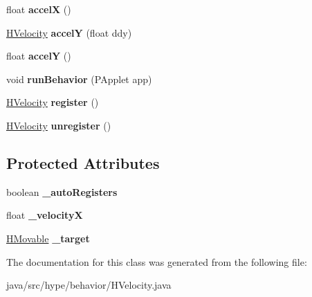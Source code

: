 \begin{DoxyCompactItemize}
\item 
\hypertarget{classhype_1_1behavior_1_1_h_velocity_ab44947a8dd5df4a12ee2cd3295beea59}{float {\bfseries accel\-X} ()}\label{classhype_1_1behavior_1_1_h_velocity_ab44947a8dd5df4a12ee2cd3295beea59}

\item 
\hypertarget{classhype_1_1behavior_1_1_h_velocity_ad1dc3d8cf2f5ce87c2a5c5dd5048e399}{\hyperlink{classhype_1_1behavior_1_1_h_velocity}{H\-Velocity} {\bfseries accel\-Y} (float ddy)}\label{classhype_1_1behavior_1_1_h_velocity_ad1dc3d8cf2f5ce87c2a5c5dd5048e399}

\item 
\hypertarget{classhype_1_1behavior_1_1_h_velocity_a71da143ee1531bb9a57a9d155eaa7028}{float {\bfseries accel\-Y} ()}\label{classhype_1_1behavior_1_1_h_velocity_a71da143ee1531bb9a57a9d155eaa7028}

\item 
\hypertarget{classhype_1_1behavior_1_1_h_velocity_acc6d4560989de30788ec2ae4f1ea6913}{void {\bfseries run\-Behavior} (P\-Applet app)}\label{classhype_1_1behavior_1_1_h_velocity_acc6d4560989de30788ec2ae4f1ea6913}

\item 
\hypertarget{classhype_1_1behavior_1_1_h_velocity_acefec10ae890e65be256238ed0e2800f}{\hyperlink{classhype_1_1behavior_1_1_h_velocity}{H\-Velocity} {\bfseries register} ()}\label{classhype_1_1behavior_1_1_h_velocity_acefec10ae890e65be256238ed0e2800f}

\item 
\hypertarget{classhype_1_1behavior_1_1_h_velocity_a5673f18c65637da5063bb7b9b66c7905}{\hyperlink{classhype_1_1behavior_1_1_h_velocity}{H\-Velocity} {\bfseries unregister} ()}\label{classhype_1_1behavior_1_1_h_velocity_a5673f18c65637da5063bb7b9b66c7905}

\end{DoxyCompactItemize}
\subsection*{Protected Attributes}
\begin{DoxyCompactItemize}
\item 
\hypertarget{classhype_1_1behavior_1_1_h_velocity_a406b8d2770d53f58f2acb61c281ac4e2}{boolean {\bfseries \-\_\-auto\-Registers}}\label{classhype_1_1behavior_1_1_h_velocity_a406b8d2770d53f58f2acb61c281ac4e2}

\item 
\hypertarget{classhype_1_1behavior_1_1_h_velocity_a9f3e36117e086a406bd2cdda2493687f}{float {\bfseries \-\_\-velocity\-X}}\label{classhype_1_1behavior_1_1_h_velocity_a9f3e36117e086a406bd2cdda2493687f}

\item 
\hypertarget{classhype_1_1behavior_1_1_h_velocity_a9533316db780c8de9b1583549640fd4c}{\hyperlink{interfacehype_1_1interfaces_1_1_h_movable}{H\-Movable} {\bfseries \-\_\-target}}\label{classhype_1_1behavior_1_1_h_velocity_a9533316db780c8de9b1583549640fd4c}

\end{DoxyCompactItemize}


The documentation for this class was generated from the following file\-:\begin{DoxyCompactItemize}
\item 
java/src/hype/behavior/H\-Velocity.\-java\end{DoxyCompactItemize}
